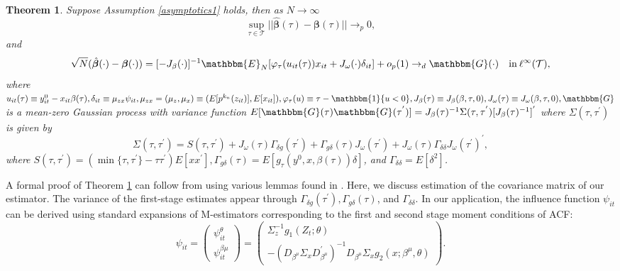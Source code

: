 \documentclass[12pt]{article}
\newtheorem{theorem}{Theorem}[section]
\begin{document}
\begin{appendices}
\begin{theorem} \label{atheorem}
Suppose Assumption \ref{asymptotics1} holds, then as $N\rightarrow\infty$
\begin{equation*}
\underset{\tau\in\mathcal{T}}{\operatorname{\sup}}||\hat{\boldsymbol{\beta}}(\tau)-\boldsymbol{\beta}(\tau)||\rightarrow_{p} 0,
\end{equation*}
and
\begin{equation*}
\sqrt{N}(\hat{\boldsymbol{\beta}}(\cdot)-\boldsymbol{\beta}(\cdot))=[-J_{\beta}(\cdot)]^{-1}\mathbbm{E}_{N}[\varphi_{\tau}(u_{it}(\tau))x_{it}+J_{\omega}(\cdot)\delta_{it}]+o_{p}(1)\rightarrow_{d} \mathbbm{G}(\cdot) \quad \text{in}\: \ell^{\infty}(\mathcal{T}),
\end{equation*}
where $u_{it}(\tau)\equiv y^{0}_{it}-x_{it}\beta(\tau), \delta_{it}\equiv\mu_{zx}\psi_{it}, \mu_{zx}=(\mu_{z}, \mu_{x})\equiv(E[p^{k_{n}}(z_{it})], E[x_{it}]), \varphi_{\tau}(u)\equiv\tau-\mathbbm{1}\{u<0\}, J_{\beta}(\tau)\equiv J_{\beta}(\beta, \tau, 0), J_{\omega}(\tau)\equiv J_{\omega}(\beta, \tau, 0), \mathbbm{G}$ is a mean-zero Gaussian process with variance function $E[\mathbbm{G}(\tau)\mathbbm{G}(\tau^{'})]=J_{\beta}(\tau)^{-1}\Sigma(\tau, \tau^{'})[J_{\beta}(\tau)^{-1}]^{'}$ where $\Sigma(\tau, \tau^{'})$ is given by
\begin{equation*}
\Sigma(\tau, \tau^{'})=S(\tau,\tau^{'})+J_{\omega}(\tau)\Gamma_{\delta g}(\tau^{'})+\Gamma_{g\delta}(\tau)J_{\omega}(\tau^{'})+J_{\omega}(\tau)\Gamma_{\delta\delta}J_{\omega}(\tau^{'})^{'},
\end{equation*}
where $S(\tau,\tau^{'})=(\min\{\tau,\tau^{'}\}-\tau\tau^{'})E[xx^{'}], \Gamma_{g\delta}(\tau)=E[g_{\tau}(y^{0},x,\beta(\tau))\delta]$, and $\Gamma_{\delta\delta}=E[\delta^{2}]$.
\end{theorem}
A formal proof of Theorem \ref{atheorem} can follow from using various lemmas found in \cite{Chernozhukov2005}. Here, we discuss estimation of the covariance matrix of our estimator. The variance of the first-stage estimates appear through $\Gamma_{\delta g}(\tau^{'}), \Gamma_{g\delta}(\tau)$, and $\Gamma_{\delta\delta}$. In our application, the influence function $\psi_{it}$ can be derived using standard expansions of M-estimators corresponding to the first and second stage moment conditions of ACF:
\begin{equation*}
\psi_{it}=
\begin{pmatrix}
\psi^{\theta}_{it}\\
\psi^{\beta{\mu}}_{it}
\end{pmatrix}
=
\begin{pmatrix}
\Sigma_{z}^{-1}g_{1}(Z_{t};\theta)\\
-(D_{\beta^{\mu}}\Sigma_{x}D_{\beta^{\mu}}^{'})^{-1}D_{\beta^{\mu}}\Sigma_{x}g_{2}(x; \beta^{\mu}, \theta)
\end{pmatrix}.
\end{equation*}


\end{appendices}
\end{document}
